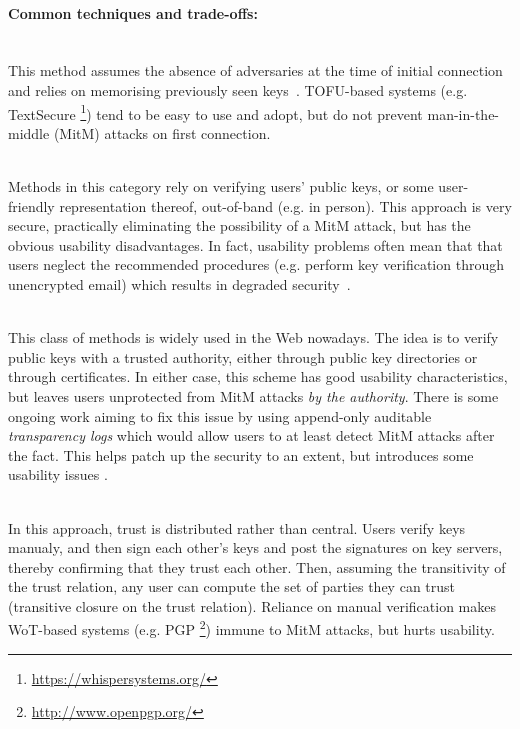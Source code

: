 \documentclass[a4paper, 12pt]{report}
\begin{document}
\paragraph{Common techniques and trade-offs:} \hspace{-8pt}
\begin{description}[labelindent=0.5cm, leftmargin=1.3cm]
    \item[Trust-on-First-Use (TOFU)] \hfill \\
        This method assumes the absence of adversaries at the time of initial connection and relies on memorising previously seen keys~\cite{wendlandt2008perspectives}. TOFU-based systems (e.g. TextSecure \footnote{\url{https://whispersystems.org/}}) tend to be easy to use and adopt, but do not prevent man-in-the-middle (MitM) attacks on first connection.
    \item[Manual Verification Methods] \hfill \\
        Methods in this category rely on verifying users' public keys, or some user-friendly representation thereof, out-of-band (e.g. in person). This approach is very secure, practically eliminating the possibility of a MitM attack, but has the obvious usability disadvantages. In fact, usability problems often mean that that users neglect the recommended procedures (e.g. perform key verification through unencrypted email) which results in degraded security~\cite{beautement2009compliance}.
    \item[Authority-based trust] \hfill \\
        This class of methods is widely used in the Web nowadays. The idea is to verify public keys with a trusted authority, either through public key directories or through certificates. In either case, this scheme has good usability characteristics, but leaves users unprotected from MitM attacks \textit{by the authority}. There is some ongoing work \cite{ryan2014enhanced}\cite{laurie2014certificate}\cite{melara2014coniks} aiming to fix this issue by using append-only auditable \textit{transparency logs} which would allow users to at least detect MitM attacks after the fact. This helps patch up the security to an extent, but introduces some usability issues \cite{unger2015sok}.
    \item[Web-of-Trust (WoT)] \hfill \\
        In this approach, trust is distributed rather than central. Users verify keys manualy, and then sign each other's keys and post the signatures on key servers, thereby confirming that they trust each other. Then, assuming the transitivity of the trust relation, any user can compute the set of parties they can trust (transitive closure on the trust relation). Reliance on manual verification makes WoT-based systems (e.g. PGP \footnote{\url{http://www.openpgp.org/}}) immune to MitM attacks, but hurts usability.
\end{description}
\end{document}
